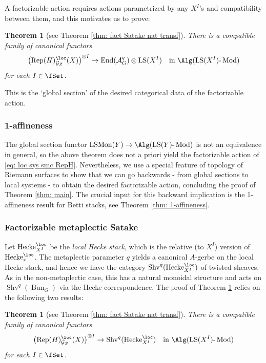 \documentclass[10pt]{amsart}
\newcommand{\sssec}{\subsubsection}
\newtheorem{thm}[subsubsection]{Theorem}
\theoremstyle{remark}
\newcommand{\te}{\text}
\newcommand{\on}{\operatorname}
\newcommand{\cA}{\mathcal{A}}
\newcommand{\cG}{\mathcal{G}}
\newcommand{\LSMon}{\on{LSMon}}
\newcommand{\lMod}{\text{-}\on{Mod}}
\newcommand{\Rep}{\on{Rep}}
\newcommand{\Shv}{\on{Shv}}
\newcommand{\LS}{\on{LS}}
\DeclareMathOperator{\End}{End}
\newcommand{\Hecke}{\on{Hecke}}
\newcommand{\Bun}{\on{Bun}}
\begin{document}
A factorizable action requires actions parametrized by any $X^I$'s and compatibility between them, and this motivates us to prove:
\begin{thm}[see Theorem \ref{thm: fact Satake nat transf}]\label{thm: fact action after global section}
    There is a compatible family of canonical functors
    \begin{equation*}
        \left(\Rep(H)^{\loc}_{\cG_Z}(X)\right)^{\otimes I}\rightarrow \End(\cA^q_G)\otimes\LS(X^I)\quad \te{in }\Alg(\LS(X^I)\lMod)
    \end{equation*}
    for each $I\in\fSet$.
\end{thm}

This is the `global section' of the desired categorical data of the factorizable action.

\sssec{1-affineness}
The global section functor $\LSMon(Y)\rightarrow \Alg(\LS(Y)\lMod)$ is not an equivalence in general, so the above theorem does not a priori yield the factorizable action of \eqref{eq: loc sys smc RepH}. Nevertheless, we use a special feature of topology of Riemann surfaces to show that we can go backwards - from global sections to local systems - to obtain the desired factorizable action, concluding the proof of Theorem \ref{thm: main}. The crucial input for this backward implication is the 1-affineness result for Betti stacks, see Theorem \ref{thm: 1-affineness}.




\sssec{Factorizable metaplectic Satake}
Let $\Hecke^{\loc}_{X^I}$ be the \emph{local Hecke stack}, which is the relative (to $X^I$) version of $\Hecke^{\loc}_x$. The metaplectic parameter $q$ yields a canonical $A$-gerbe on the local Hecke stack, and hence we have the category $\Shv^q(\Hecke^{\loc}_{X^I})$ of twisted sheaves. As in the non-metaplectic case, this has a natural monoidal structure and acts on $\Shv^q(\Bun_G)$ via the Hecke correspondence. The proof of Theorem \ref{thm: fact action after global section} relies on the following two results:
\begin{thm}[see Theorem \ref{thm: fact Satake nat transf}]\label{thm: fact Satake intro}
    There is a compatible family of canonical functors
    \begin{equation}\label{eq: LS linear met Satake}
        \left(\Rep(H)^{\loc}_{\cG_Z}(X)\right)^{\otimes I}\rightarrow \Shv^q(\Hecke^{\loc}_{X^I})\quad\te{in }\Alg(\LS(X^I)\lMod)
    \end{equation}
    for each $I\in\fSet$.
\end{thm}
\end{document}
